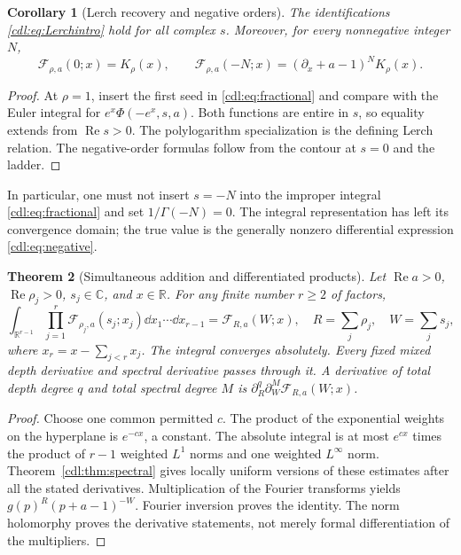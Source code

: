 \documentclass[11pt,letterpaper]{article}
\numberwithin{equation}{section}
\newtheorem{theorem}{Theorem}[section]
\newtheorem{corollary}[theorem]{Corollary}
\theoremstyle{definition}\newtheorem{definition}[theorem]{Definition}
\theoremstyle{remark}\newtheorem{remark}[theorem]{Remark}
\newcommand{\C}{\mathbb C}\newcommand{\R}{\mathbb R}
\newcommand{\Rea}{\operatorname{Re}}\newcommand{\Ima}{\operatorname{Im}}
\newcommand{\F}{\mathcal F}\newcommand{\E}{\mathcal E}
\begin{document}
\begin{corollary}[Lerch recovery and negative orders]\label{cdl:cor:recovery}
The identifications \eqref{cdl:eq:Lerchintro} hold for all complex $s$.
Moreover, for every nonnegative integer $N$,
\begin{equation}\label{cdl:eq:negative}
 \F_{\rho,a}(0;x)=K_\rho(x),\qquad
 \F_{\rho,a}(-N;x)=(\partial_x+a-1)^N K_\rho(x).
\end{equation}
\end{corollary}
\begin{proof}
At $\rho=1$, insert the first seed in \eqref{cdl:eq:fractional} and
compare with the Euler integral for $e^x\Phi(-e^x,s,a)$.
Both functions are entire in $s$, so equality extends from $\Rea s>0$.
The polylogarithm specialization is the defining Lerch relation.
The negative-order formulas follow from the contour at $s=0$ and the ladder.
\end{proof}

In particular, one must not insert $s=-N$ into the improper integral
\eqref{cdl:eq:fractional} and set $1/\Gamma(-N)=0$.
The integral representation has left its convergence domain; the true
value is the generally nonzero differential expression
\eqref{cdl:eq:negative}.

\begin{theorem}[Simultaneous addition and differentiated products]
\label{cdl:thm:addition}
Let $\Rea a>0$, $\Rea\rho_j>0$, $s_j\in\C$, and $x\in\R$.
For any finite number $r\ge2$ of factors,
\begin{equation}\label{cdl:eq:addition}
 \int_{\R^{r-1}}\prod_{j=1}^r\F_{\rho_j,a}(s_j;x_j)
 \dd x_1\cdots\dd x_{r-1}
 =\F_{R,a}(W;x),
 \quad R=\sum_j\rho_j,\quad W=\sum_js_j,
\end{equation}
where $x_r=x-\sum_{j<r}x_j$. The integral converges absolutely.
Every fixed mixed depth derivative and spectral derivative passes through
it. A derivative of total depth degree $q$ and total spectral degree $M$
is $\partial_R^q\partial_W^M\F_{R,a}(W;x)$.
\end{theorem}
\begin{proof}
Choose one common permitted $c$. The product of the exponential weights
on the hyperplane is $e^{-cx}$, a constant. The absolute integral is at
most $e^{cx}$ times the product of $r-1$ weighted $L^1$ norms and one
weighted $L^\infty$ norm. Theorem~\ref{cdl:thm:spectral} gives locally
uniform versions of these estimates after all the stated derivatives.
Multiplication of the Fourier transforms yields
$g(p)^R(p+a-1)^{-W}$. Fourier inversion proves the identity.
The norm holomorphy proves the derivative statements, not merely formal
differentiation of the multipliers.
\end{proof}
\end{document}
